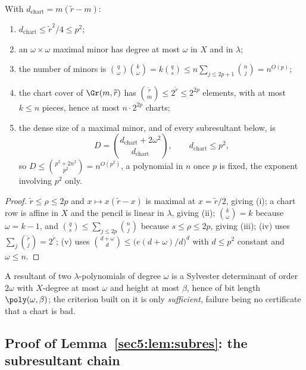 \begin{lem}\label{appBC:lem:chart}\label{appBC:rem:poly}
With $d_{\mathrm{chart}}=m(\widetilde r-m)$:
\begin{enumerate}[label=(\roman*),leftmargin=*]
\item $d_{\mathrm{chart}}\le\widetilde r^{2}/4\le p^{2}$;
\item an $\omega\times\omega$ maximal minor has degree at most $\omega$ in $X$ and in $\lambda$;
\item the number of minors is
$\binom q\omega\binom k\omega=k\binom qs\le n\sum_{j\le2p+1}\binom nj=n^{O(p)}$;
\item the chart cover of $\Gr(m,\widetilde r)$ has $\binom{\widetilde r}{m}\le2^{\widetilde r}\le2^{2p}$
elements, with at most $k\le n$ pieces, hence at most $n\cdot2^{2p}$ charts;
\item the dense size of a maximal minor, and of every subresultant below, is
\begin{equation}\label{appBC:eq:denseminor}
D=\binom{d_{\mathrm{chart}}+2\omega^{2}}{d_{\mathrm{chart}}},\qquad d_{\mathrm{chart}}\le p^{2},
\end{equation}
so $D\le\binom{p^{2}+2n^{2}}{p^{2}}=n^{O(p^{2})}$, a polynomial in $n$ once $p$ is fixed, the exponent
involving $p^{2}$ only.
\end{enumerate}
\end{lem}

\begin{proof}
$\widetilde r\le\rho\le2p$ and $x\mapsto x(\widetilde r-x)$ is maximal at $x=\widetilde r/2$, giving
(i); a chart row is affine in $X$ and the pencil is linear in $\lambda$, giving (ii);
$\binom k\omega=k$ because $\omega=k-1$, and $\binom qs\le\sum_{j\le2p}\binom nj$ because
$s\le\rho\le2p$, giving (iii); (iv) uses $\sum_j\binom{\widetilde r}j=2^{\widetilde r}$; (v) uses
$\binom{d+\omega}d\le\bigl(e(d+\omega)/d\bigr)^{d}$ with $d\le p^{2}$ constant and $\omega\le n$.
\end{proof}

A resultant of two $\lambda$-polynomials of degree $\omega$ is a Sylvester determinant of order
$2\omega$ with $X$-degree at most $\omega$ and height at most $\beta$, hence of bit length
$\poly(\omega,\beta)$; the criterion built on it is only \emph{sufficient}, failure being no certificate
that a chart is bad.

\subsection{Proof of Lemma~\ref{sec5:lem:subres}: the subresultant chain}\label{appBC:sub:subres}

